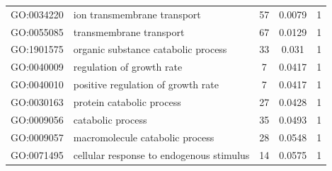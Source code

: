 \documentclass[10pt,letterpaper]{article}
\begin{document}
\begin{table}[]
\begin{tabular}{llccc}
GO:0034220          & ion transmembrane transport                                                                & 57                                                     & 0.0079                                                & 1                                                  \\
GO:0055085          & transmembrane transport                                                                    & 67                                                     & 0.0129                                                & 1                                                  \\
GO:1901575          & organic substance catabolic process                                                        & 33                                                     & 0.031                                                 & 1                                                  \\
GO:0040009          & regulation of growth rate                                                                  & 7                                                      & 0.0417                                                & 1                                                  \\
GO:0040010          & positive regulation of growth rate                                                         & 7                                                      & 0.0417                                                & 1                                                  \\
GO:0030163          & protein catabolic process                                                                  & 27                                                     & 0.0428                                                & 1                                                  \\
GO:0009056          & catabolic process                                                                          & 35                                                     & 0.0493                                                & 1                                                  \\
GO:0009057          & macromolecule catabolic process                                                            & 28                                                     & 0.0548                                                & 1                                                  \\
GO:0071495          & cellular response to endogenous stimulus                                                   & 14                                                     & 0.0575                                                & 1                                                  \\

\end{tabular}
\end{table}
\end{document}
